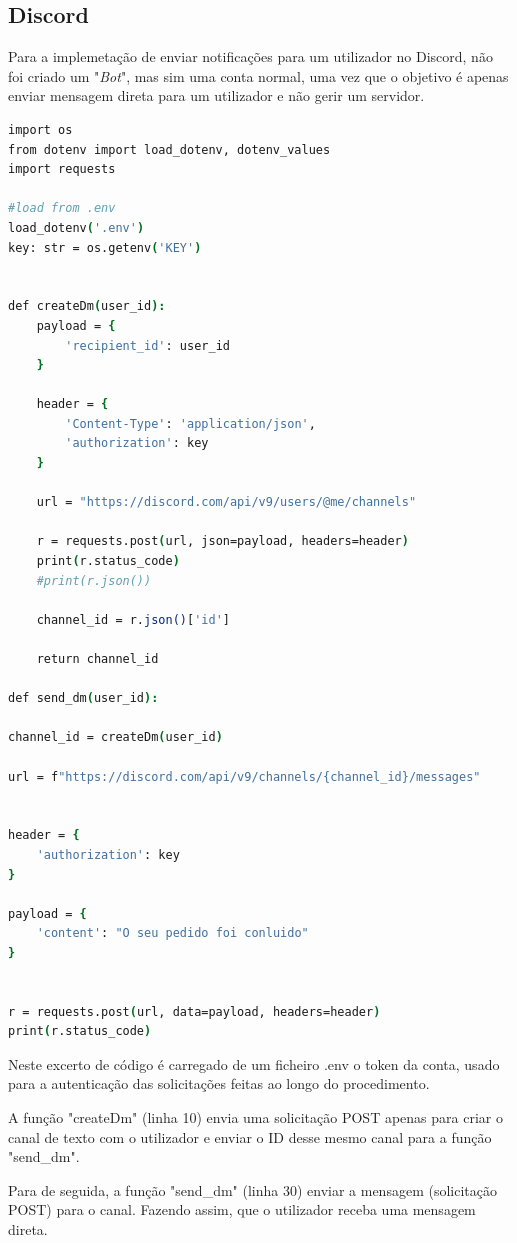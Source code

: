 \subsection{Discord}

Para a implemetação de enviar notificações para um utilizador no Discord,
não foi criado um "\textit{Bot}", mas sim uma conta normal, uma vez que o objetivo é apenas
enviar mensagem direta para um utilizador e não gerir um servidor.

\begin{lstlisting}[language=csh, caption={Envio de notificação via Discord}]
import os
from dotenv import load_dotenv, dotenv_values
import requests

#load from .env
load_dotenv('.env')
key: str = os.getenv('KEY')


def createDm(user_id):
    payload = {
        'recipient_id': user_id
    }
    
    header = {
        'Content-Type': 'application/json',
        'authorization': key
    }

    url = "https://discord.com/api/v9/users/@me/channels"
    
    r = requests.post(url, json=payload, headers=header)
    print(r.status_code)
    #print(r.json())

    channel_id = r.json()['id']
    
    return channel_id

def send_dm(user_id):

channel_id = createDm(user_id)

url = f"https://discord.com/api/v9/channels/{channel_id}/messages"


header = {  
    'authorization': key
}

payload = {
    'content': "O seu pedido foi conluido"
}


r = requests.post(url, data=payload, headers=header)
print(r.status_code)
\end{lstlisting}

Neste excerto de código é carregado de um ficheiro .env o token da conta, usado para
a autenticação das solicitações feitas ao longo do procedimento.

A função "createDm" (linha 10) envia uma solicitação POST apenas para criar o canal de texto
com o utilizador e enviar o ID desse mesmo canal para a função "send\_dm".

Para de seguida, a função "send\_dm" (linha 30) enviar a mensagem (solicitação POST) para 
o canal. Fazendo assim, que o utilizador receba uma mensagem direta.

